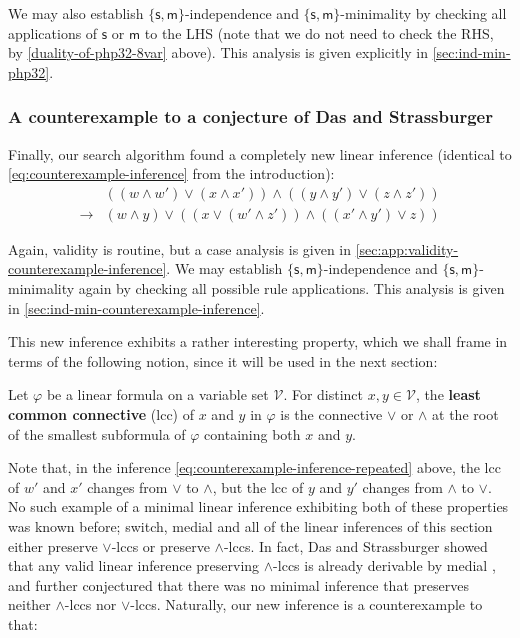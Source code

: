 \documentclass[a4paper, UKenglish, cleveref]{lipics-v2021}
\renewcommand{\phi}{\varphi}
\newcommand{\V}{\ensuremath{\mathcal{V}}}
\newcommand{\m}{\ensuremath{\mathsf{m}}}
\newcommand{\s}{\ensuremath{\mathsf{s}}}
\begin{document}
We may also establish $\{\s,\m \}$-independence and $\{\s,\m \}$-minimality by checking all applications of $\s$ or $\m$ to the LHS (note that we do not need to check the RHS, by \cref{duality-of-php32-8var} above).
This analysis is given explicitly in \cref{sec:ind-min-php32}.


%
%
%
%
%
%
%

\subsubsection{A counterexample to a conjecture of Das and Strassburger}
\label{sec:counterexample-inference}
Finally, our search algorithm found a completely new linear inference
(identical to \eqref{eq:counterexample-inference} from the introduction):
%
%
%
%
%
%
\begin{equation}
\label{eq:counterexample-inference-repeated}
\begin{array}{rl}
& ((w \land w') \lor (x \land x')) \land ((y \land y') \lor (z \land z')) \\
\to & (w \land y) \lor ((x \lor (w'\land z')) \land ((x'\land y') \lor z) )
\end{array}
\end{equation}


Again, validity is routine, but a case analysis is given in \cref{sec:app:validity-counterexample-inference}.
We may establish $\{\s,\m \}$-independence and $\{\s,\m \}$-minimality again by checking all possible rule applications.
This analysis is given in \cref{sec:ind-min-counterexample-inference}.


This new inference exhibits a rather interesting property, which we shall frame in terms of the following notion, since it will be used in the next section:
\begin{definition}
\label{definition-of-lccs}
Let $\phi$ be a linear formula on a variable set $\V$. For distinct $x,y \in \V$, the \textbf{least common connective} (lcc) of $x$ and $y $ in $\phi$ is the connective $\lor$ or $\land$ at the root of the smallest subformula of $\phi$ containing both $x$ and $y$.
\end{definition}
Note that, in the inference \eqref{eq:counterexample-inference-repeated} above, the lcc of $w' $ and $x'$ changes from $\lor$ to $\land$, but the lcc of $y$ and $y'$ changes from $\land$ to $\lor$.
No such example of a minimal linear inference exhibiting both of these properties was known before; switch, medial and all of the linear inferences of this section either preserve $\lor$-lccs or preserve $\land$-lccs.
In fact, Das and Strassburger showed that any valid linear inference preserving $\land$-lccs is already derivable by medial \cite[Theorem 7.5]{DasStr16:no-compl-lin-sys}, and further conjectured that there was no minimal inference that preserves neither $\land$-lccs nor $\lor$-lccs.
Naturally, our new inference is a counterexample to that:
\end{document}
